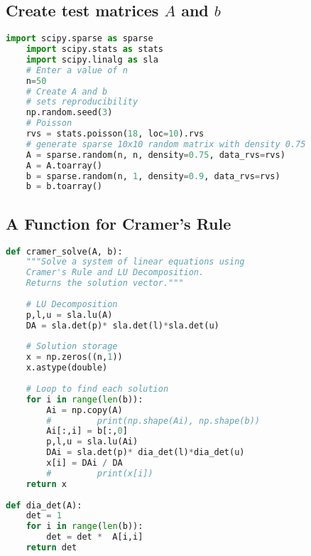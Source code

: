\documentclass[12pt]{article}
\begin{document}
\subsection*{Create test matrices $A$ and $b$}
\begin{lstlisting}[language=Python]
	import scipy.sparse as sparse
	import scipy.stats as stats
	import scipy.linalg as sla
	# Enter a value of n
	n=50
	# Create A and b
	# sets reproducibility
	np.random.seed(3) 
	# Poisson
	rvs = stats.poisson(18, loc=10).rvs
	# generate sparse 10x10 random matrix with density 0.75
	A = sparse.random(n, n, density=0.75, data_rvs=rvs)
	A = A.toarray()
	b = sparse.random(n, 1, density=0.9, data_rvs=rvs)
	b = b.toarray()
\end{lstlisting}

\subsection*{A Function for Cramer's Rule}
\begin{lstlisting}[language=Python]
def cramer_solve(A, b):
	"""Solve a system of linear equations using 
	Cramer's Rule and LU Decomposition.
	Returns the solution vector."""
	
	# LU Decomposition
	p,l,u = sla.lu(A)
	DA = sla.det(p)* sla.det(l)*sla.det(u)
	
	# Solution storage
	x = np.zeros((n,1))
	x.astype(double)
	
	# Loop to find each solution
	for i in range(len(b)):
		Ai = np.copy(A)
		#         print(np.shape(Ai), np.shape(b))
		Ai[:,i] = b[:,0]
		p,l,u = sla.lu(Ai)
		DAi = sla.det(p)* dia_det(l)*dia_det(u)
		x[i] = DAi / DA
		#         print(x[i])
	return x
	
def dia_det(A):
	det = 1
	for i in range(len(b)):
		det = det *  A[i,i]
	return det
\end{lstlisting}

\begin{align*}
\end{align*}

\begin{lstlisting}[language=Python]
\end{lstlisting}
\end{document}
